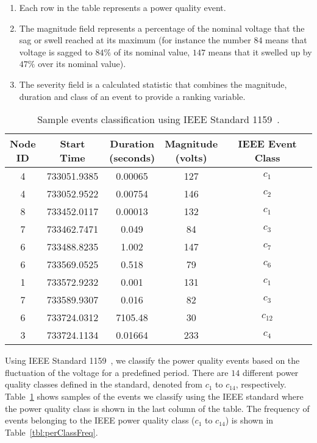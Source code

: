 \begin{enumerate}
\item Each row in the table represents a power quality event.
\item The magnitude field represents a percentage of the nominal voltage that the sag or swell reached at its maximum (for instance the number $84$ means that voltage is sagged to $84\%$ of its nominal value, $147$ means that it swelled up by $47\%$ over its nominal value).
\item The severity field is a calculated statistic that combines the magnitude, duration and class of an event to provide a ranking variable.
\end{enumerate}

\begin{table}[!t]
\caption{Sample events classification using IEEE Standard 1159~\cite{IEEE09_1159}.}
\centering 
\begin{tabular}{|c|c|c|c|c|}
\hline \specialcell{Node\\ID} & Start Time & \specialcell{Duration\\(seconds)} & \specialcell{Magnitude\\(volts)} & IEEE Event Class\tabularnewline
\hline 4 & 733051.9385 & 0.00065 & 127 & $c_1$\tabularnewline
 4 & 733052.9522 & 0.00754 & 146 & $c_2$\tabularnewline
 8 & 733452.0117 & 0.00013 & 132 & $c_1$\tabularnewline
 7 & 733462.7471 & 0.049 & 84 & $c_3$\tabularnewline
 6 & 733488.8235 & 1.002 & 147 & $c_7$\tabularnewline
 6 & 733569.0525 & 0.518 & 79 & $c_6$\tabularnewline
 1 & 733572.9232 & 0.001 & 131 & $c_1$\tabularnewline
 7 & 733589.9307 & 0.016 & 82 & $c_3$\tabularnewline
 6 & 733724.0312 & 7105.48 & 30 & $c_{12}$\tabularnewline
 3 & 733724.1134 & 0.01664 & 233 & $c_4$\tabularnewline
\hline 
\end{tabular}
\label{tbl:sampleClassData}
\end{table}

Using IEEE Standard 1159~\cite{IEEE09_1159}, we classify the power quality events based on the fluctuation of the voltage for a predefined period. There are $14$ different power quality classes defined in the standard, denoted from $c_1$ to $c_{14}$, respectively. Table~\ref{tbl:sampleClassData} shows samples of the events we classify using the IEEE standard where the power quality class is shown in the last column of the table. The frequency of events belonging to the IEEE power quality class ($c_1$ to $c_{14}$) is shown in Table~\ref{tbl:perClassFreq}.


